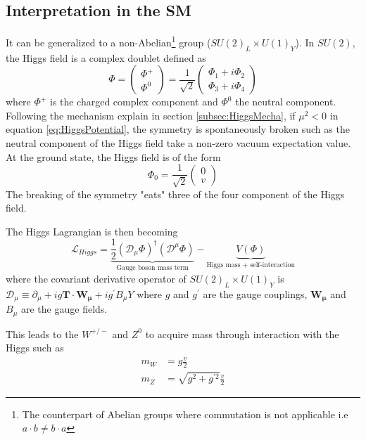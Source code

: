 \subsection{Interpretation in the SM}
\label{sec:HiggsSM}

It can be generalized to a non-Abelian\footnote{The counterpart of Abelian groups where commutation is not applicable i.e $a \cdot b \neq b \cdot a$} group ($SU(2)_{L} \times U(1)_{Y}$). In $SU(2)$, the Higgs field is a complex doublet defined as
\begin{equation}
\Phi = \begin{pmatrix} \Phi^+ \\ \Phi^0 \end{pmatrix}= \frac{1}{\sqrt{2}} \begin{pmatrix} \Phi_1+i\Phi_2 \\ \Phi_3+i\Phi_4 \end{pmatrix}
\end{equation}
where $\Phi^+$ is the charged complex component and $\Phi^0$ the neutral component. Following the mechanism explain in section \ref{subsec:HiggsMecha}, if $\mu^2 < 0$ in equation \ref{eq:HiggsPotential}, the symmetry is spontaneously broken such as the neutral component of the Higgs field take a non-zero vacuum expectation value. At the ground state, the Higgs field is of the form
\begin{equation}
\Phi_0 = \frac{1}{\sqrt{2}}\begin{pmatrix} 0 \\ v \end{pmatrix}
\end{equation}
The breaking of the symmetry "eats" three of the four component of the Higgs field.

The Higgs Lagrangian is then becoming
\begin{equation}
  \mathcal{L}_{Higgs} = \underbrace{\frac{1}{2}(\mathcal{D}_{\mu}\Phi)^{\dagger}(\mathcal{D}^{\mu}\Phi)}_{\text{Gauge boson mass term}} - \underbrace{V(\Phi)}_{\text{Higgs mass + self-interaction}}
\end{equation}
where the covariant derivative operator of $SU(2)_{L} \times U(1)_{Y}$ is $\mathcal{D}_{\mu} \equiv \partial_{\mu} + ig\mathbf{T} \cdot \mathbf{W_{\mu}} + ig^{\prime} B_{\mu}Y$ where $g$ and $g^{\prime}$ are the gauge couplings, $\mathbf{W_{\mu}}$ and $B_{\mu}$ are the gauge fields.

This leads to the $W^{+/-}$ and $Z^0$ to acquire mass through interaction with the Higgs such as
\begin{equation}
  \begin{aligned}
    m_{W} &= g\frac{v}{2}\\
    m_{Z} &= \sqrt{g^2 + g^{\prime 2}}\frac{v}{2}
  \end{aligned}
\end{equation}

